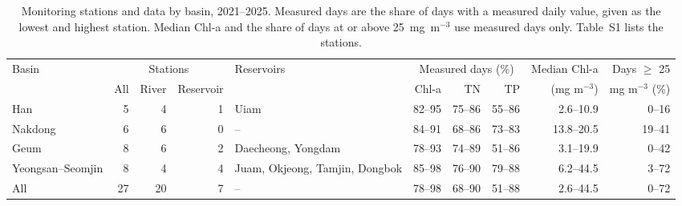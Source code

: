 \begin{table}[tbp]
\centering
\caption{Monitoring stations and data by basin, 2021--2025. Measured days are the share of days with a measured daily value, given as the lowest and highest station. Median Chl-a and the share of days at or above 25~mg~m$^{-3}$ use measured days only. Table~S1 lists the stations.}
\label{tab:stations}
\footnotesize
\setlength{\tabcolsep}{4pt}
\begin{adjustbox}{max width=\textwidth}
\begin{tabular}{lrrrlrrrrr}
\toprule
Basin & \multicolumn{3}{c}{Stations} & Reservoirs & \multicolumn{3}{c}{Measured days (\%)} & Median Chl-a & Days $\geq$ 25 \\ \cmidrule(lr){2-4}\cmidrule(lr){6-8}
 & All & River & Reservoir & & Chl-a & TN & TP & (mg m$^{-3}$) & mg m$^{-3}$ (\%) \\
\midrule
Han & 5 & 4 & 1 & Uiam & 82--95 & 75--86 & 55--86 & 2.6--10.9 & 0--16 \\
Nakdong & 6 & 6 & 0 & -- & 84--91 & 68--86 & 73--83 & 13.8--20.5 & 19--41 \\
Geum & 8 & 6 & 2 & Daecheong, Yongdam & 78--93 & 74--89 & 51--86 & 3.1--19.9 & 0--42 \\
Yeongsan--Seomjin & 8 & 4 & 4 & Juam, Okjeong, Tamjin, Dongbok & 85--98 & 76--90 & 79--88 & 6.2--44.5 & 3--72 \\
\midrule
All & 27 & 20 & 7 & -- & 78--98 & 68--90 & 51--88 & 2.6--44.5 & 0--72 \\
\bottomrule
\end{tabular}
\end{adjustbox}
\end{table}
